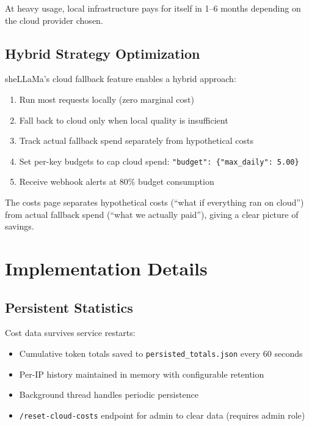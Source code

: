 \documentclass[11pt,a4paper]{article}
\begin{document}
At heavy usage, local infrastructure pays for itself in 1--6 months depending on the cloud provider chosen.

\subsection{Hybrid Strategy Optimization}

sheLLaMa's cloud fallback feature enables a hybrid approach:

\begin{enumerate}
  \item Run most requests locally (zero marginal cost)
  \item Fall back to cloud only when local quality is insufficient
  \item Track actual fallback spend separately from hypothetical costs
  \item Set per-key budgets to cap cloud spend: \texttt{"budget": \{"max\_daily": 5.00\}}
  \item Receive webhook alerts at 80\% budget consumption
\end{enumerate}

The costs page separates hypothetical costs (``what if everything ran on cloud'') from actual fallback spend (``what we actually paid''), giving a clear picture of savings.

\section{Implementation Details}

\subsection{Persistent Statistics}

Cost data survives service restarts:

\begin{itemize}
  \item Cumulative token totals saved to \texttt{persisted\_totals.json} every 60 seconds
  \item Per-IP history maintained in memory with configurable retention
  \item Background thread handles periodic persistence
  \item \texttt{/reset-cloud-costs} endpoint for admin to clear data (requires admin role)
\end{itemize}
\end{document}
